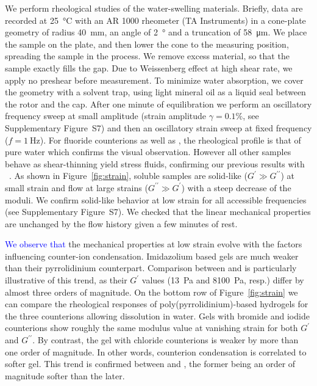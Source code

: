 \documentclass[twoside,twocolumn,9pt]{article}
\newcommand{\figSfrequency}{S7\xspace}
\begin{document}
We perform rheological studies of the water-swelling materials. Briefly, data are recorded at \SI{25}{\celsius} with an AR 1000 rheometer (TA Instruments) in a cone-plate geometry of radius \SI{40}{\milli\metre}, an angle of \SI{2}{\degree} and a truncation of \SI{58}{\micro\metre}\cite{Macosko1994,Larson1999}. We place the sample on the plate, and then lower the cone to the measuring position, spreading the sample in the process. We remove excess material, so that the sample exactly fills the gap. Due to Weissenberg effect at high shear rate, we apply no preshear before measurement. To minimize water absorption, we cover the geometry with a solvent trap, using light mineral oil as a liquid seal between the rotor and the cap. After one minute of equilibration we perform an oscillatory frequency sweep at small amplitude (strain amplitude $\gamma=0.1\%$, see Supplementary Figure~\figSfrequency) and then an oscillatory strain sweep at fixed frequency ($f=\SI{1}{\hertz}$). For fluoride counterions as well as , the rheological profile is that of pure water which confirms the visual observation. However all other samples behave as shear-thinning yield stress fluids, confirming our previous results with ~\cite{Srour2014}. As shown in Figure~\ref{fig:strain}, soluble samples are solid-like ($G^\prime \gg G^{\prime\prime}$) at small strain and flow at large strains ($G^{\prime\prime} \gg G^\prime$) with a steep decrease of the moduli. We confirm solid-like behavior at low strain for all accessible frequencies (see Supplementary Figure~\figSfrequency). We checked that the linear mechanical properties are unchanged by the flow history given a few minutes of rest.

\textcolor{blue}{We observe that} the mechanical properties at low strain evolve with the factors influencing counter-ion condensation. Imidazolium based gels are much weaker than their pyrrolidinium counterpart. Comparison between  and  is particularly illustrative of this trend, as their $G^\prime$ values (\SI{13}{\pascal} and \SI{8100}{\pascal}, resp.) differ by almost three orders of magnitude. On the bottom row of Figure~\ref{fig:strain} we can compare the rheological responses of poly(pyrrolidinium)-based hydrogels for the three counterions allowing dissolution in water. Gels with bromide and iodide counterions show roughly the same modulus value at vanishing strain for both $G^\prime$ and $G^{\prime\prime}$. By contrast, the gel with chloride counterions is weaker by more than one order of magnitude. In other words, counterion condensation is correlated to softer gel. This trend is confirmed between  and , the former being an order of magnitude softer than the later.
\end{document}
